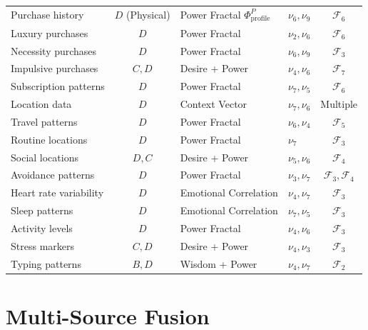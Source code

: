 \documentclass[11pt,twoside]{book}
\newcommand{\noe}[1]{\nu_{#1}}
\newcommand{\Foundations}{\mathcal{F}}
\newcommand{\ProfileFrac}{\Phi_{\mathrm{profile}}}
\begin{document}
\begin{center}
\begin{longtable}{>{\raggedright\arraybackslash}p{2.5cm}|c|>{\raggedright\arraybackslash}p{3cm}|>{\raggedright\arraybackslash}p{3cm}|c}
\midrule

Purchase history & $D$ (Physical) & Power Fractal $\ProfileFrac^P$ & $\noe{6}, \noe{9}$ & $\Foundations_6$ \\
Luxury purchases & $D$ & Power Fractal & $\noe{2}, \noe{6}$ & $\Foundations_6$ \\
Necessity purchases & $D$ & Power Fractal & $\noe{6}, \noe{9}$ & $\Foundations_3$ \\
Impulsive purchases & $C, D$ & Desire + Power & $\noe{4}, \noe{6}$ & $\Foundations_7$ \\
Subscription patterns & $D$ & Power Fractal & $\noe{7}, \noe{5}$ & $\Foundations_6$ \\

\midrule

Location data & $D$ & Context Vector & $\noe{7}, \noe{6}$ & Multiple \\
Travel patterns & $D$ & Power Fractal & $\noe{6}, \noe{4}$ & $\Foundations_5$ \\
Routine locations & $D$ & Power Fractal & $\noe{7}$ & $\Foundations_3$ \\
Social locations & $D, C$ & Desire + Power & $\noe{5}, \noe{6}$ & $\Foundations_4$ \\
Avoidance patterns & $D$ & Power Fractal & $\noe{3}, \noe{7}$ & $\Foundations_3, \Foundations_4$ \\

\midrule

Heart rate variability & $D$ & Emotional Correlation & $\noe{4}, \noe{7}$ & $\Foundations_3$ \\
Sleep patterns & $D$ & Emotional Correlation & $\noe{7}, \noe{5}$ & $\Foundations_3$ \\
Activity levels & $D$ & Power Fractal & $\noe{4}, \noe{6}$ & $\Foundations_3$ \\
Stress markers & $C, D$ & Desire + Power & $\noe{4}, \noe{3}$ & $\Foundations_3$ \\
Typing patterns & $B, D$ & Wisdom + Power & $\noe{4}, \noe{7}$ & $\Foundations_2$ \\

\end{longtable}
\end{center}

\section{Multi-Source Fusion}
\end{document}
